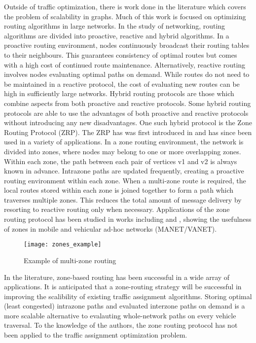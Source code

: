 \documentclass[conference]{IEEEtran}
\begin{document}
Outside of traffic optimization, there is work done in the literature which covers the problem of scalability in graphs. Much of this work is focused on optimizing routing algorithms in large networks. In the study of networking, routing algorithms are divided into proactive, reactive and hybrid algorithms. In a proactive routing environment, nodes continuously broadcast their routing tables to their neighbours. This guarantees consistency of optimal routes but comes with a high cost of continued route maintenance. Alternatively, reactive routing involves nodes evaluating optimal paths on demand. While routes do not need to be maintained in a reactive protocol, the cost of evaluating new routes can be high in sufficiently large networks. Hybrid routing protocols are those which combine aspects from both proactive and reactive protocols. Some hybrid routing protocols are able to use the advantages of both proactive and reactive protocols without introducing any new disadvantages. One such hybrid protocol is the Zone Routing Protocol (ZRP). The ZRP has was first introduced in \cite{zrp} and has since been used in a variety of applications. In a zone routing environment, the network is divided into zones, where nodes may belong to one or more overlapping zones. Within each zone, the path between each pair of vertices v1 and v2 is always known in advance. Intrazone paths are updated frequently, creating a proactive routing environment within each zone. When a multi-zone route is required, the local routes stored within each zone is joined together to form a path which traverses multiple zones. This reduces the total amount of message delivery by resorting to reactive routing only when necessary. Applications of the zone routing protocol has been studied in works including \cite{hopnet} and \cite{mazacornet}, showing the usefulness of zones in mobile and vehicular ad-hoc networks (MANET/VANET). 

\begin{figure}[h]
\caption{Example of multi-zone routing}
\centering
\texttt{[image: zones\_example]}
\end{figure}

In the literature, zone-based routing has been successful in a wide array of applications. It is anticipated that a zone-routing strategy will be successful in improving the scalibility of existing traffic assignment algorithms. Storing optimal (least congested) intrazone paths and evaluated interzone paths on demand is a more scalable alternative to evalauting whole-network paths on every vehicle traversal. To the knowledge of the authors, the zone routing protocol has not been applied to the traffic assignment optimization problem.
\end{document}
